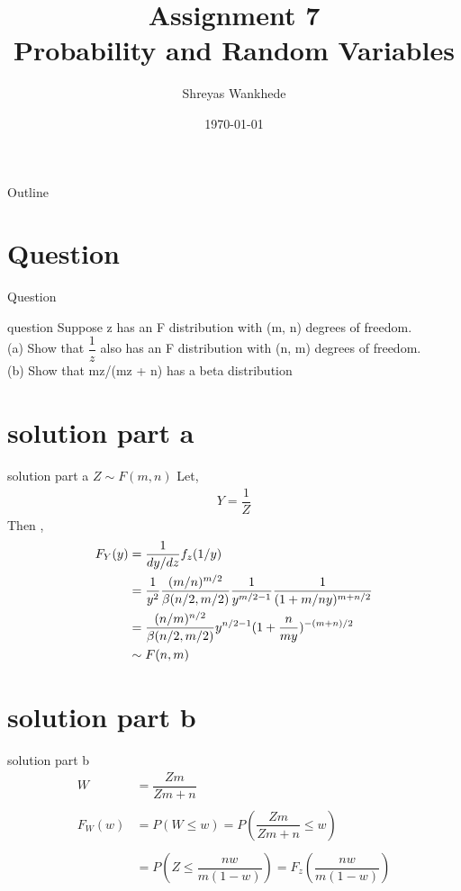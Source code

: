 \documentclass{beamer}
\title{Assignment 7\\Probability and Random Variables}
\author{Shreyas Wankhede}
\date{\today}
\institute{IIT Hyderabad}
\begin{document}
\begin{frame}
    \titlepage 
\end{frame}

\logo{}


\begin{frame}{Outline}
    \tableofcontents
\end{frame}


\section{Question}
\begin{frame}{Question}
\begin{block}{question}
  Suppose z has an F distribution with (m, n) degrees of freedom.\\ (a) Show that $\dfrac{1}{z}$ also has
an F distribution with (n, m) degrees of freedom.\\ (b) Show that mz/(mz + n) has a beta
distribution
\end{block}


\end{frame}


\section{solution part a}
\begin{frame}{solution part a}
   $Z\sim F(m,n)$ Let,
   \begin{align}
   Y=\dfrac{1}{Z}\nonumber
   \end{align}
   Then ,
   \begin{align}
   F_Y(y)&=\dfrac{1}{dy/dz}f_z(1/y)\nonumber\\\vspace{5mm}
  &=\dfrac{1}{y^2}\dfrac{(m/n)^{m/2}}{\beta(n/2,m/2)}\dfrac{1}{y^{m/2 -1}}\dfrac{1}{(1+m/ny)^{m+n/2}}\nonumber\\\vspace{5mm}
  &=\dfrac{(n/m)^{n/2}}{\beta(n/2,m/2)}y^{n/2 -1}(1+\dfrac{n}{my})^{-(m+n)/2}\nonumber\\\vspace{5mm}
  &\sim F(n,m)\nonumber
   \end{align}
\end{frame} 

\section{solution part b}
\begin{frame}{solution part b}
   \begin{align}
   W&=\dfrac{Zm}{Zm+n}\nonumber\\\nonumber\\
   F_W(w)&=P(W\le w)=P(\dfrac{Zm}{Zm+n}\le w)\nonumber\\\nonumber\\
   &=P(Z \le \dfrac{nw}{m(1-w)})= F_z(\dfrac{nw}{m(1-w)})\nonumber
   \end{align}
\end{frame}
\end{document}

